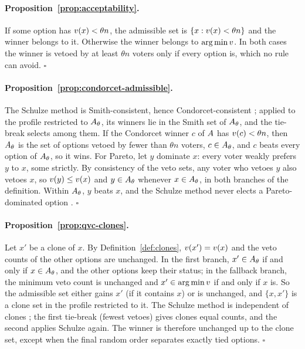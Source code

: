 \paragraph{Proposition~\ref{prop:acceptability}.}
If some option has $v(x) < \theta n$, the admissible set is $\{x : v(x) < \theta n\}$ and the
winner belongs to it. Otherwise the winner belongs to $\arg\min v$. In both cases the winner is vetoed
by at least $\theta n$ voters only if every option is, which no rule can avoid. \hfill$\square$

\paragraph{Proposition~\ref{prop:condorcet-admissible}.}
The Schulze method is Smith-consistent, hence Condorcet-consistent \citep{Schulze2011}; applied to the
profile restricted to $A_\theta$, its winners lie in the Smith set of $A_\theta$, and the tie-break selects among
them. If the Condorcet winner $c$ of $A$ has $v(c) < \theta n$, then $A_\theta$ is the set of options
vetoed by fewer than $\theta n$ voters, $c \in A_\theta$, and $c$ beats every option of $A_\theta$, so it wins.
For Pareto, let $y$ dominate $x$: every voter weakly prefers $y$ to $x$, some strictly. By consistency of the
veto sets, any voter who vetoes $y$ also vetoes $x$, so $v(y) \le v(x)$ and $y \in A_\theta$ whenever
$x \in A_\theta$, in both branches of the definition. Within $A_\theta$, $y$ beats $x$, and the Schulze method never
elects a Pareto-dominated option \citep{Schulze2011}. \hfill$\square$

\paragraph{Proposition~\ref{prop:qvc-clones}.}
Let $x'$ be a clone of $x$. By Definition~\ref{def:clones}, $v(x') = v(x)$ and the veto counts of
the other options are unchanged. In the first branch, $x' \in A_\theta$ if and only if $x \in A_\theta$, and the
other options keep their status; in the fallback branch, the minimum veto count is unchanged and
$x' \in \arg\min v$ if and only if $x$ is. So the admissible set either gains $x'$ (if it contains
$x$) or is unchanged, and $\{x, x'\}$ is a clone set in the profile restricted to it. The Schulze method is
independent of clones \citep{Schulze2011}; the first tie-break (fewest vetoes) gives clones equal counts,
and the second applies Schulze again. The winner is therefore unchanged up to the clone set, except when
the final random order separates exactly tied options. \hfill$\square$

